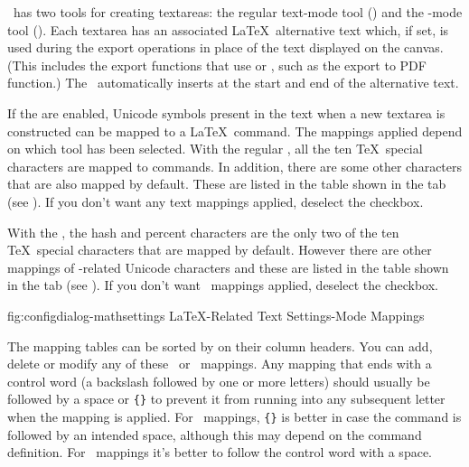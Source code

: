 %
%
\FlowframTk\ has two tools for creating \glspl{textarea}: the
regular text-mode tool () and the
-mode tool (). Each \gls{textarea} has an
associated \LaTeX\ alternative text which, if set, is used
during the  export operations in place of the
text displayed on the \gls{canvas}. (This includes the export
functions that use  or , such as
the export to PDF function.) The \mathstool\ automatically
inserts  at the start and end of the
alternative text. 


If the  are enabled, Unicode symbols present in
the text when a new \gls*{textarea} is constructed can be mapped to
a \LaTeX\ command.
The mappings applied depend on which tool has been selected. With
the regular \texttool, all the ten \TeX\ special characters are
mapped to commands. In addition, there are some other characters
that are also mapped by default. These are listed in the table shown
in the  tab (see
). If you don't want any
text mappings applied, deselect the
 \gls{checkbox}.


With the \mathstool, the \gls{hash} and \gls{percent} characters are the
only two of the ten \TeX\ special characters that are mapped by
default. However there are other mappings of -related Unicode
characters and these are listed in the table shown in the
 tab (see
). If you don't want
\mathsmode\ mappings applied, deselect the
 \gls*{checkbox}.

\FloatFig
  {fig:configdialog-mathsettings}
  {}
  {LaTeX-Related Text Settings\dash {}-Mode Mappings}

The mapping tables can be sorted by  on
their column headers. You can add, delete or modify any of these
\textmode\ or \mathsmode\ mappings. Any mapping that ends with a control
word (a backslash followed by one or more letters) should
usually be followed by a space or \verb|{}| to prevent it from
running into any subsequent letter when the mapping is applied. For
\textmode\ mappings, \verb|{}| is better in case the command is
followed by an intended space, although this may depend on the
command definition. For \mathsmode\ mappings it's better
to follow the control word with a space.

